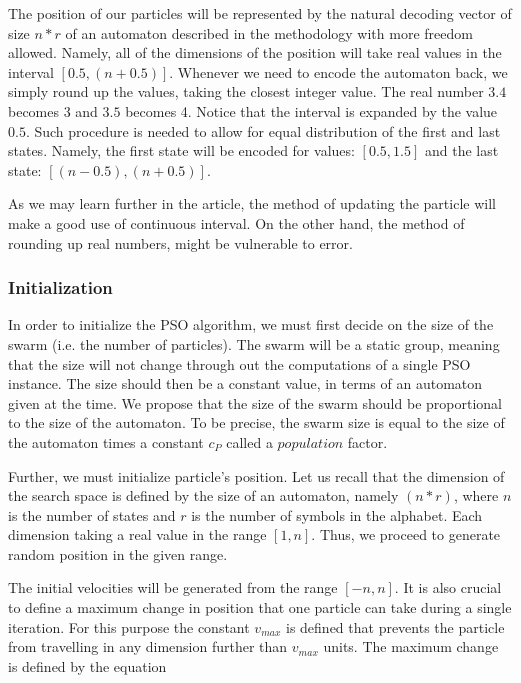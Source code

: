 \documentclass[runningheads, a4paper]{llncs}
\begin{document}
The position of our particles will be represented by the natural decoding vector of size $n*r$ of an automaton described in the methodology with more freedom allowed. Namely, all of the dimensions of the position will take real values in the interval $[0.5, (n+0.5)]$. Whenever we need to encode the automaton back, we simply round up the values, taking the closest integer value. The real number $3.4$ becomes $3$ and $3.5$ becomes 4. Notice that the interval is expanded by the value $0.5$. Such procedure is needed to allow for equal distribution of the first and last states. Namely, the first state will be encoded for values: $[0.5, 1.5]$ and the last state: $[(n-0.5), (n+0.5)]$.

As we may learn further in the article, the method of updating the particle will make a good use of continuous interval. On the other hand, the method of rounding up real numbers, might be vulnerable to error.


\subsubsection{Initialization}
In order to initialize the PSO algorithm, we must first decide on the size of the swarm (i.e. the number of particles). The swarm will be a static group, meaning that the size will not change through out the computations of a single PSO instance. The size should then be a constant value, in terms of an automaton given at the time. We propose that the size of the swarm should be proportional to the size of the automaton. To be precise, the swarm size is equal to the size of the automaton times a constant $c_P$ called a $population$ factor.

Further, we must initialize particle's position. Let us recall that the dimension of the search space is defined by the size of an automaton, namely $(n*r)$, where $n$ is the number of states and $r$ is the number of symbols in the alphabet. Each dimension taking a real value in the range $[1, n]$. Thus, we proceed to generate random position in the given range.

The initial velocities will be generated from the range $[-n,n]$. It is also crucial to define a maximum change in position that one particle can take during a single iteration. For this purpose the constant $v_{max}$ is defined that prevents the particle from travelling in any dimension further than $v_{max}$ units. The maximum change is defined by the equation 
\end{document}
